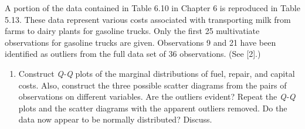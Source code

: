 A portion of the data contained in Table 6.10 in Chapter 6 is reproduced in Table 5.13.
These data represent various costs associated with transporting milk from farms to dairy
plants for gasoline trucks. Only the first 25 multivatiate observations for gasoline trucks
are given. Observations 9 and 21 have been identified as outliers from the full data set of
36 observations. (See [2].)

\begin{enumerate}[label= (\alph*)]
    \item Construct \textit{Q-Q} plots of the marginal distributions of fuel, repair, and capital costs.
    Also, construct the three possible scatter diagrams from the pairs of observations on
    different variables. Are the outliers evident? Repeat the \textit{Q-Q} plots and the scatter
    diagrams with the apparent outliers removed. Do the data now appear to be normally
    distributed? Discuss.


\end{enumerate}
